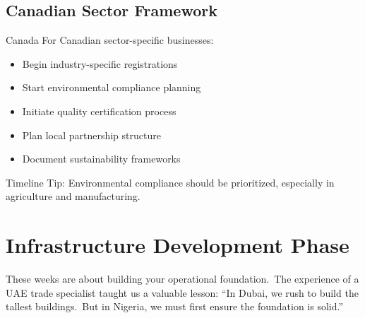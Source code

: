 \subsection{Canadian Sector Framework}\label{subsec:canadian-setup}
\begin{regionalbox}{Canada}
For Canadian sector-specific businesses:
\begin{itemize}
    \item Begin industry-specific registrations
    \item Start environmental compliance planning
    \item Initiate quality certification process
    \item Plan local partnership structure
    \item Document sustainability frameworks
\end{itemize}

Timeline Tip: Environmental compliance should be prioritized, especially in agriculture and manufacturing.

%
\end{regionalbox}

\section{Infrastructure Development Phase}\label{sec:infrastructure-phase}

These weeks are about building your operational foundation.\ The experience of a UAE trade specialist taught us a valuable lesson: ``In Dubai, we rush to build the tallest buildings.\ But in Nigeria, we must first ensure the foundation is solid.''

